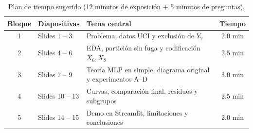 \documentclass[11pt,a4paper]{article}
\begin{document}
\begin{table}[H]
\centering
\caption{Plan de tiempo sugerido (12 minutos de exposición + 5 minutos de preguntas).}
\small
\begin{tabular}{cllc}
\toprule
\textbf{Bloque} & \textbf{Diapositivas} & \textbf{Tema central} & \textbf{Tiempo} \\
\midrule
1 & Slides 1 -- 3 & Problema, datos UCI y exclusión de $Y_2$ & 2.0 min \\
2 & Slides 4 -- 6 & EDA, partición sin fuga y codificación $X_6, X_8$ & 2.5 min \\
3 & Slides 7 -- 9 & Teoría MLP en simple, diagrama original y experimentos A--D & 3.0 min \\
4 & Slides 10 -- 13 & Curvas, comparación final, residuos y subgrupos & 2.5 min \\
5 & Slides 14 -- 15 & Demo en Streamlit, limitaciones y conclusiones & 2.0 min \\
\bottomrule
\end{tabular}
\end{table}
\end{document}
